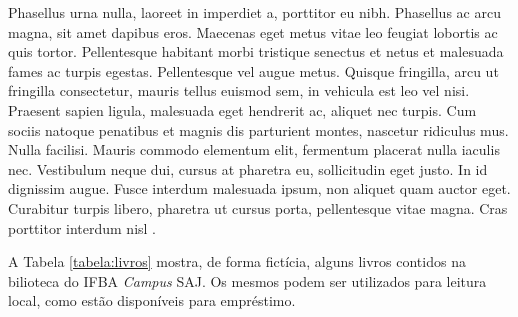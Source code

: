 \documentclass[tec, ads, scr, classic, a4paper,twoside]{ifbatcc}
\begin{document}
Phasellus urna nulla, laoreet in imperdiet a, porttitor eu nibh. Phasellus ac arcu magna, sit amet dapibus eros. Maecenas eget metus vitae leo feugiat lobortis ac quis tortor. Pellentesque habitant morbi tristique senectus et netus et malesuada fames ac turpis egestas. Pellentesque vel augue metus. Quisque fringilla, arcu ut fringilla consectetur, mauris tellus euismod sem, in vehicula est leo vel nisi. Praesent sapien ligula, malesuada eget hendrerit ac, aliquet nec turpis. Cum sociis natoque penatibus et magnis dis parturient montes, nascetur ridiculus mus. Nulla facilisi. Mauris commodo elementum elit, fermentum placerat nulla iaculis nec. Vestibulum neque dui, cursus at pharetra eu, sollicitudin eget justo. In id dignissim augue. Fusce interdum malesuada ipsum, non aliquet quam auctor eget. Curabitur turpis libero, pharetra ut cursus porta, pellentesque vitae magna. Cras porttitor  interdum nisl .

A Tabela \ref{tabela:livros} mostra, de forma fictícia, alguns livros contidos na bilioteca do IFBA \textit{Campus} SAJ. Os mesmos podem ser utilizados para leitura local, como estão disponíveis para empréstimo.

\backmatter

\appendix

% 
% 
% 









\colophon

\end{document}
